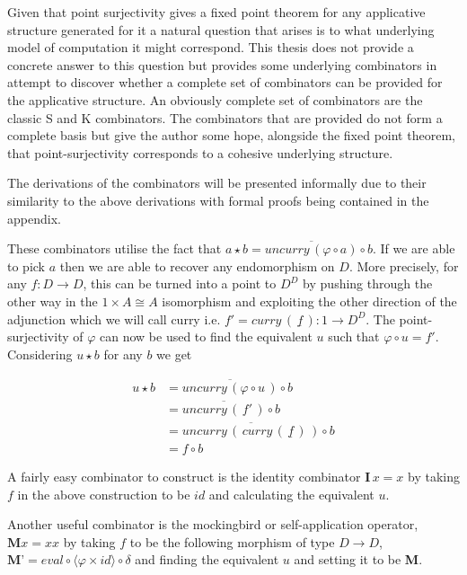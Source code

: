 Given that point surjectivity gives a fixed point theorem for any applicative
structure generated for it a natural question that arises is to what underlying
model of computation it might correspond. This thesis does not provide a
concrete answer to this question but provides some underlying combinators in
attempt to discover whether a complete set of combinators can be provided for
the applicative structure. An obviously complete set of combinators are the
classic S and K combinators. The combinators that are provided do not form a
complete basis but give the author some hope, alongside the fixed point theorem,
that point-surjectivity corresponds to a cohesive underlying structure.

The derivations of the combinators will be presented informally due to their
similarity to the above derivations with formal proofs being contained in the
appendix.

These combinators utilise the fact that $a \star b =
\overline{uncurry \, (\varphi \circ a)} \circ b$. If we are able to pick $a$
then we are able to recover any endomorphism on $D$. More precisely, for any $f:
D \rightarrow D$, this can be turned into a point to $D^D$ by pushing through
the other way in the $1 \times A \cong A$ isomorphism and exploiting the other
direction of the adjunction which we will call curry i.e. $f' = curry \, (
\,\underline{f} \,) : 1 \rightarrow D^D$. The point-surjectivity of $\varphi$
can now be used to find the equivalent $u$ such that $\varphi \circ u = f'$.
Considering $u \star b$ for any $b$ we get

\begin{align*}
    u \star b &= \overline{uncurry \, (\varphi \circ u \, )} \circ b \\
    &= \overline{uncurry \, ( \, f' \, ) } \circ b \\
    &= \overline{uncurry \, ( \, curry \, ( \, \underline{f} \, ) \, )} \circ b \\
    &= f \circ b
\end{align*}


A fairly easy combinator to construct is the identity combinator $\textbf{I} \, x =
x$ by taking $f$ in the above construction to be $id$ and calculating the
equivalent $u$.

Another useful combinator is the mockingbird or self-application operator,
$\textbf{M} x = x x$ by taking $f$ to be the following morphism of type $D
\rightarrow D$, $\textbf{M'} = eval \circ \langle \varphi \times id \rangle \circ
\delta$ and finding the equivalent $u$ and setting it to be \textbf{M}.

